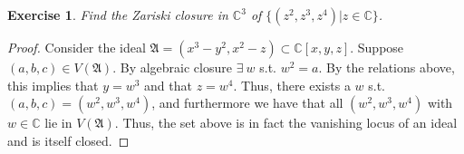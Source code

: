 \documentclass{article}
\newcommand{\bb}[1]{\mathbb{#1}}
\newcommand{\fk}[1]{\mathfrak{#1}}
\newtheorem{exercise}{Exercise}
\begin{document}
\begin{exercise}
  Find the Zariski closure in $\bb{C}^{3}$ of $\{(z^{2},z^{3},z^{4}) | z \in \bb{C}\}$.
\end{exercise}
\begin{proof}
  Consider the ideal $\fk{A} = (x^{3}-y^{2}, x^{2} - z) \subset \bb{C}[x,y,z]$. Suppose $(a,b,c) \in V(\fk{A})$. By algebraic closure $\exists \ w$ s.t. $w^{2} = a$. By the relations above, this implies that $y = w^{3}$ and that $z = w^{4}$. Thus, there exists a $w$ s.t. $(a,b,c) = (w^{2}, w^{3}, w^{4})$, and furthermore we have that all $(w^{2}, w^{3}, w^{4})$ with $w \in \bb{C}$ lie in $V(\fk{A})$. Thus, the set above is in fact the vanishing locus of an ideal and is itself closed. 
\end{proof}
\end{document}
